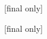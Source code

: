 \chapter*{}

\vspace{2em}

\begin{savenotes}  %


  \setlength{\epigraphwidth}{30ex}

  \epigraph{
    [final only]
  }{
    [final only] %
  }

\end{savenotes}